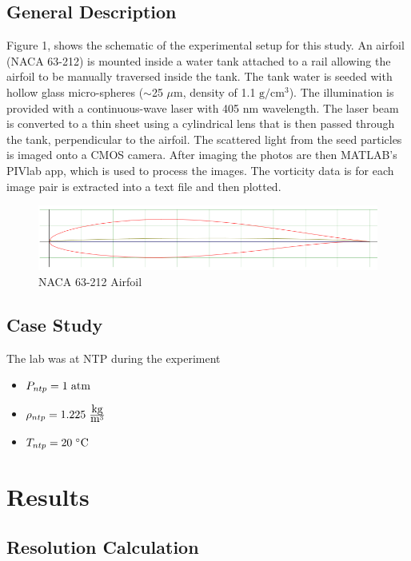 \documentclass[12pt]{article}
\begin{document}
\subsection{General Description}
Figure 1, shows the schematic of the experimental setup for this study. An airfoil (NACA 63-212) is mounted inside a water tank attached to a rail allowing the airfoil to be manually traversed inside the tank. The tank water is seeded with hollow glass micro-spheres (\(\sim\)25 \(\mu\)m, density of 1.1 \(\mbox{g}/\mbox{cm}^3\)). The illumination is provided with a continuous-wave laser with 405 nm wavelength. The laser beam is converted to a thin sheet using a cylindrical lens that is then passed through the tank, perpendicular to the airfoil. The scattered light from the seed particles is imaged onto a CMOS camera. After imaging the photos are then MATLAB's PIVlab app, which is used to process the images. The vorticity data is for each image pair is extracted into a text file and then plotted.
    \begin{figure}[h]
    \includegraphics[width=14 cm]{airfoil.PNG}
    \centering
    \caption{NACA 63-212 Airfoil}
    \end{figure}


\subsection{Case Study}
The lab was at NTP during the experiment
\begin{itemize}
    \item \(P_{ntp} = 1 \hspace{3 pt}\mbox{atm}\)
    \item  \(\rho_{ntp} = 1.225  \hspace{3 pt}\frac{\mbox{kg}}{{\mbox{m}}^3}\)
    \item \(T_{ntp} = 20 \hspace{3 pt}\degree\mbox{C}\)
\end{itemize}

\newpage
\section{Results}
\subsection{Resolution Calculation}
\end{document}
